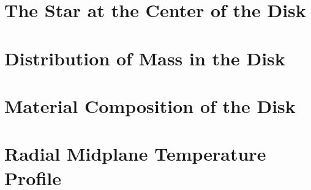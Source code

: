 \section{The Star at the Center of the Disk}
\section{Distribution of Mass in the Disk}
\section{Material Composition of the Disk}
\section{Radial Midplane Temperature Profile}
